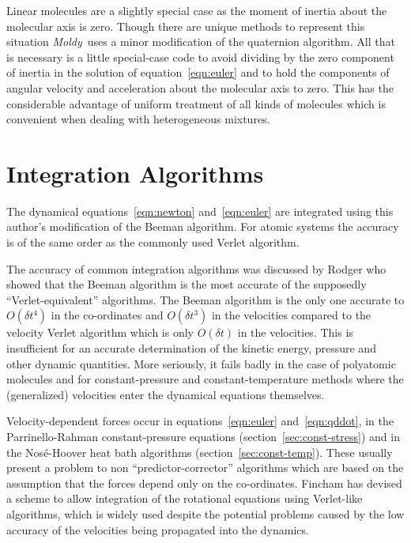 \documentclass[a4paper,twoside]{report}
\newcommand{\moldy}{\emph{Moldy}}
\begin{document}
Linear molecules are a slightly special case as the moment of inertia
about the molecular axis is zero.  Though there are unique methods to
represent this situation\cite[page 90]{allen:87} \moldy\ uses a minor
modification of the quaternion algorithm.  All that is necessary is a
little special-case code to avoid dividing by the zero component of
inertia in the solution of equation~\ref{eqn:euler} and to hold the
components of angular velocity and acceleration about the molecular
axis to zero.  This has the considerable advantage of uniform
treatment of all kinds of molecules which is convenient when dealing
with heterogeneous mixtures.

\section{Integration Algorithms}   %
\label{sec:beeman}

The dynamical equations~\ref{eqn:newton} and~\ref{eqn:euler} are
integrated using this author's modification\cite{refson:85} of the
Beeman algorithm\hspace{0pt}\cite{beeman:76}.  For atomic systems the
accuracy is of the same order as the commonly used Verlet
algorithm\cite{verlet:67}.

The accuracy of common integration algorithms was discussed by
Rodger\cite{rodger:89} who showed that the Beeman algorithm is the
most accurate of the supposedly ``Verlet-equivalent'' algorithms. The
Beeman algorithm is the only one accurate to $O(\delta t^4)$ in the
co-ordinates and $O(\delta t^3)$ in the velocities compared to the
velocity Verlet algorithm which is only $O(\delta t)$ in the
velocities. This is insufficient for an accurate determination of the
kinetic energy, pressure and other dynamic quantities. More seriously,
it fails badly in the case of polyatomic molecules and for
constant-pressure and constant-temperature methods where the
(generalized) velocities enter the dynamical equations themselves.

Velocity-dependent forces occur in equations~\ref{eqn:euler}
and~\ref{eqn:qddot}, in the Parrinello-Rahman constant-pressure
equations (section~\ref{sec:const-stress}) and in the Nos{\'e}-Hoover
heat bath algorithms (section~\ref{sec:const-temp}). These usually
present a problem to non ``predictor-corrector'' algorithms which are
based on the assumption that the forces depend only on the
co-ordinates.  Fincham has devised a scheme to allow integration of
the rotational equations using Verlet-like
algorithms\cite{fincham:92}, which is widely used despite the
potential problems caused by the low accuracy of the velocities being
propagated into the dynamics.
\end{document}
